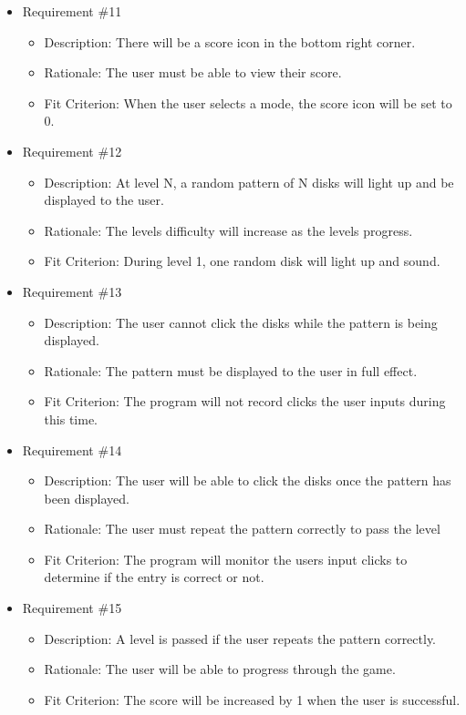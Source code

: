 \documentclass[12pt, titlepage]{article}
\begin{document}
\begin{itemize}
\item Requirement \#11
\begin{itemize}
\item Description: There will be a score icon in the bottom right corner.
\item Rationale: The user must be able to view their score.
\item Fit Criterion: When the user selects a mode, the score icon will be set to 0.
\end{itemize}

\item Requirement \#12
\begin{itemize}
\item Description: At level N, a random pattern of N disks will light up and be displayed to the user.
\item Rationale: The levels difficulty will increase as the levels progress.
\item Fit Criterion: During level 1, one random disk will light up and sound.
\end{itemize}

\item Requirement \#13
\begin{itemize}
\item Description: The user cannot click the disks while the pattern is being displayed. 
\item Rationale: The pattern must be displayed to the user in full effect.
\item Fit Criterion: The program will not record clicks the user inputs during this time.
\end{itemize}

\item Requirement \#14
\begin{itemize}
\item Description: The user will be able to click the disks once the pattern has been displayed. 
\item Rationale: The user must repeat the pattern correctly to pass the level
\item Fit Criterion: The program will monitor the users input clicks to determine if the entry is correct or not.
\end{itemize}

\item Requirement \#15
\begin{itemize}
\item Description: A level is passed if the user repeats the pattern correctly.
\item Rationale: The user will be able to progress through the game. 
\item Fit Criterion: The score will be increased by 1 when the user is successful.
\end{itemize}


\end{itemize}
\end{document}
